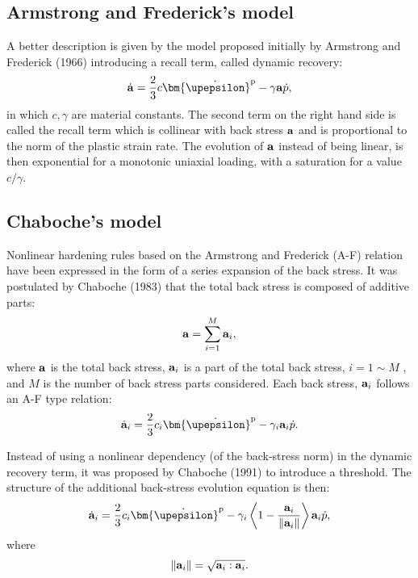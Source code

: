\subsection{Armstrong and Frederick's model}
\noindent
A better description is given by the model proposed initially by Armstrong and Frederick (1966) \cite{armstrong1966mathematical} introducing a recall term, called dynamic recovery:
\begin{equation}
{\dot {\bf a}} = \frac{2}{3}c{\bm{\dot \upepsilon }}^{\rm{p}} - \gamma {\bf{a}}\dot p,
\end{equation}
in which $c,\gamma$ are material constants.
The second term on the right hand side is called the recall term which is collinear with back stress $\bf{a}$ and is proportional to the norm of the plastic strain rate. The evolution of $\bf{a}$ instead of being linear, is then exponential for a monotonic uniaxial loading, with a saturation for a value $c/\gamma $.

\subsection{Chaboche's model}
\noindent
Nonlinear hardening rules based on the Armstrong and Frederick (A-F) relation have been expressed in the form of a series expansion of the back stress.
It was postulated by Chaboche (1983) \cite{chaboche1983plastic} that the total back stress is composed of additive parts:
\begin{equation}
{\bf{a}} = \sum\limits_{i = 1}^M {{{\bf{a}}_i}},
\end{equation}
where ${\bf{a}}$ is the total back stress, ${{{\bf{a}}_i}}$ is a part of the total back stress, $i = 1\sim M$ , and $M$ is the number of back stress parts considered. Each back stress, ${{{\bf{a}}_i}}$ follows an A-F type relation:
\begin{equation}
{{\dot{\bf a}}_i} = \frac{2}{3}{c_i}{{\bm{\dot \upepsilon }}^{\rm{p}}} - {\gamma _i}{{\bf{a}}_i}\dot p.
\end{equation}

Instead of using a nonlinear dependency (of the back-stress norm) in the dynamic recovery term, it was proposed by Chaboche (1991) \cite{Chaboche1991661} to introduce a threshold. The structure of the additional back-stress evolution equation is then:
\begin{equation}
{\dot{\bf a}}_i = \frac{2}{3}c_i{{\bm{\dot \upepsilon }}^{\rm{p}}} - {\gamma _i} \left\langle {1 - \frac{{\bf{a}}_i}{{\left\| {\bf{a}}_i \right\|}}} \right\rangle {\bf{a}}_i\dot p,
\end{equation}
where
\begin{equation}
\left\| {\bf{a}}_i \right\| = \sqrt {{\bf{a}}_i:{\bf{a}}_i}.
\end{equation}


